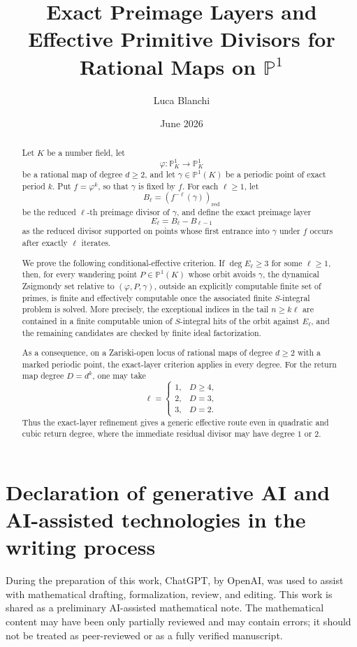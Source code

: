 \documentclass[11pt]{article}
\title{Exact Preimage Layers and Effective Primitive Divisors for Rational Maps on \(\mathbb P^1\)}
\author{Luca Blanchi}
\date{June 2026}
\begin{document}
\maketitle

\begin{abstract}
Let \(K\) be a number field, let
\[
\varphi:\mathbb P^1_K\longrightarrow \mathbb P^1_K
\]
be a rational map of degree \(d\ge2\), and let \(\gamma\in\mathbb P^1(K)\) be a periodic point of exact period \(k\). Put \(f=\varphi^k\), so that \(\gamma\) is fixed by \(f\). For each \(\ell\ge1\), let
\[
B_\ell=(f^{-\ell}(\gamma))_{\mathrm{red}}
\]
be the reduced \(\ell\)-th preimage divisor of \(\gamma\), and define the exact preimage layer
\[
E_\ell=B_\ell-B_{\ell-1}
\]
as the reduced divisor supported on points whose first entrance into \(\gamma\) under \(f\) occurs after exactly \(\ell\) iterates.

We prove the following conditional-effective criterion. If \(\deg E_\ell\ge3\) for some \(\ell\ge1\), then, for every wandering point \(P\in\mathbb P^1(K)\) whose orbit avoids \(\gamma\), the dynamical Zsigmondy set relative to \((\varphi,P,\gamma)\), outside an explicitly computable finite set of primes, is finite and effectively computable once the associated finite \(S\)-integral problem is solved. More precisely, the exceptional indices in the tail \(n\ge k\ell\) are contained in a finite computable union of \(S\)-integral hits of the orbit against \(E_\ell\), and the remaining candidates are checked by finite ideal factorization.

As a consequence, on a Zariski-open locus of rational maps of degree \(d\ge2\) with a marked periodic point, the exact-layer criterion applies in every degree. For the return map degree \(D=d^k\), one may take
\[
\ell=
\begin{cases}
1,&D\ge4,\\
2,&D=3,\\
3,&D=2.
\end{cases}
\]
Thus the exact-layer refinement gives a generic effective route even in quadratic and cubic return degree, where the immediate residual divisor may have degree \(1\) or \(2\).
\end{abstract}

\section*{Declaration of generative AI and AI-assisted technologies in the writing process}
During the preparation of this work, ChatGPT, by OpenAI, was used to assist with mathematical drafting, formalization, review, and editing. This work is shared as a preliminary AI-assisted mathematical note. The mathematical content may have been only partially reviewed and may contain errors; it should not be treated as peer-reviewed or as a fully verified manuscript.
\end{document}
